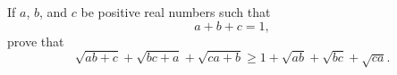 If $a$, $b$, and $c$ be positive real numbers such that
\[ a + b + c = 1, \]
prove that
\[ \sqrt{ab + c} + \sqrt{bc + a} + \sqrt{ca + b} \geq 1 + \sqrt{ab} + \sqrt{bc} + \sqrt{ca}. \]

